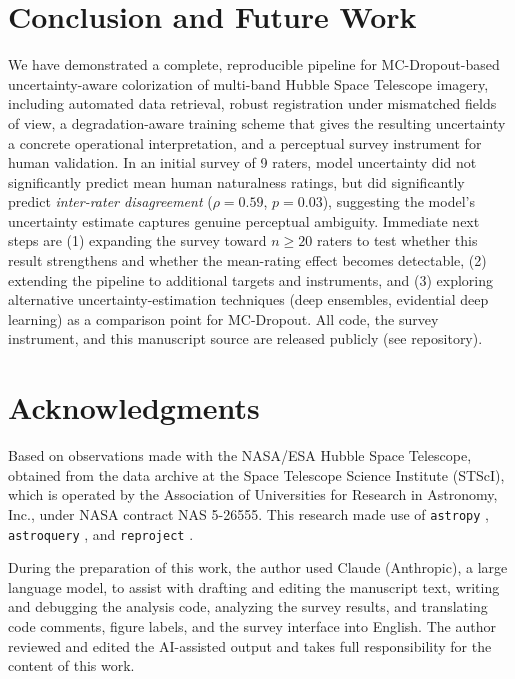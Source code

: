 \documentclass[12pt]{article}
\begin{document}
\section{Conclusion and Future Work}

We have demonstrated a complete, reproducible pipeline for MC-Dropout-based
uncertainty-aware colorization of multi-band Hubble Space Telescope
imagery, including automated data retrieval, robust registration under
mismatched fields of view, a degradation-aware training scheme that gives
the resulting uncertainty a concrete operational interpretation, and a
perceptual survey instrument for human validation. In an initial survey of
9 raters, model uncertainty did not significantly predict mean human
naturalness ratings, but did significantly predict \emph{inter-rater
disagreement} ($\rho=0.59$, $p=0.03$), suggesting the model's uncertainty
estimate captures genuine perceptual ambiguity. Immediate next steps are
(1) expanding the survey toward $n \geq 20$ raters to test whether this
result strengthens and whether the mean-rating effect becomes detectable,
(2) extending the pipeline to additional targets and instruments, and (3)
exploring alternative uncertainty-estimation techniques (deep ensembles,
evidential deep learning) as a comparison point for MC-Dropout. All code,
the survey instrument, and this manuscript source are released publicly
(see repository).

\section*{Acknowledgments}
Based on observations made with the NASA/ESA Hubble Space Telescope,
obtained from the data archive at the Space Telescope Science Institute
(STScI), which is operated by the Association of Universities for Research
in Astronomy, Inc., under NASA contract NAS 5-26555. This research made use
of \texttt{astropy} \citep{astropy2018}, \texttt{astroquery}
\citep{astroquery}, and \texttt{reproject} \citep{reproject}.

During the preparation of this work, the author used Claude (Anthropic), a large language model, to assist with drafting and editing the manuscript text, writing and debugging the analysis code, analyzing the survey results, and translating code comments, figure labels, and the survey interface into English. The author reviewed and edited the AI-assisted output and takes full responsibility for the content of this work.
\end{document}

